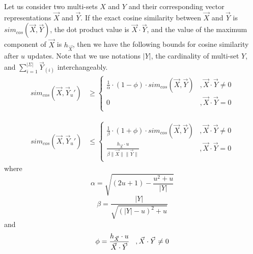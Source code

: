 \begin{property}  
Let us consider two multi-sets $X$ and $Y$ and their corresponding vector representations $\vec{X}$ and $\vec{Y}$. If the exact cosine similarity between $\vec{X}$ and $\vec{Y}$ is $sim_{cos}(\vec{X}, \vec{Y})$, the dot product value is $\vec{X}\cdot \vec{Y}$, and the value of the maximum component of $\vec{X}$ is $h_{\vec{X}}$, then we have the following bounds for cosine similarity after $u$ updates. Note that we use notations $|Y|$, the cardinality of multi-set $Y$, and $\sum_{i=1}^{|\Sigma|}\vec{Y}_{(i)}$ interchangeably.
\begin{align*} 
sim_{cos}(\vec{X}, \vec{Y}_u') &\geq 
\begin{cases}
\frac{1}{\alpha} \cdot (1-\phi)\cdot sim_{cos}(\vec{X}, \vec{Y}) & , \vec{X}\cdot \vec{Y} \neq 0\\
0 & , \vec{X}\cdot \vec{Y} = 0\\
\end{cases}
\end{align*}

\begin{align*}
sim_{cos}(\vec{X}, \vec{Y}_u') &\leq 
\begin{cases}
\frac{1}{\beta} \cdot (1+\phi)\cdot sim_{cos}(\vec{X}, \vec{Y}) & , \vec{X}\cdot \vec{Y} \neq 0\\
\frac{h_{\vec{X}}\cdot u}{\beta \|\vec{X}\|\|\vec{Y}\|} & , \vec{X}\cdot \vec{Y} = 0\\
\end{cases}
\end{align*} 
where $$\alpha=\sqrt{(2u+1)-\frac{u^2+u}{|Y|}}$$ 
$$\beta=\frac{|Y|}{\sqrt{(|Y|-u)^2+u}}$$ 
and 
$$\phi = \frac{h_{\vec{X}}\cdot u}{\vec{X}\cdot \vec{Y}}\hspace{3 mm},\vec{X}\cdot \vec{Y} \neq 0$$ 
\end{property}

